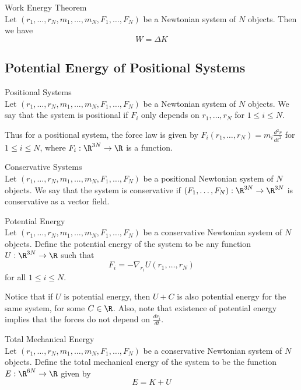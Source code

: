 \documentclass[a4paper]{article}
\begin{document}
\begin{thm}{Work Energy Theorem}{}\\
Let $(r_1,\dots,r_N,m_1,\dots,m_N,F_1,\dots,F_N)$ be a Newtonian system of $N$ objects. Then we have $$W=\Delta K$$
\end{thm}

\subsection{Potential Energy of Positional Systems}
\begin{defn}{Positional Systems}{}\\
Let $(r_1,\dots,r_N,m_1,\dots,m_N,F_1,\dots,F_N)$ be a Newtonian system of $N$ objects. We say that the system is positional if $F_i$ only depends on $r_1,\dots,r_N$ for $1\leq i\leq N$. 
\end{defn}

Thus for a positional system, the force law is given by $F_i(r_1,\dots,r_N)=m_i\frac{d^2r}{dt^2}$ for $1\leq i\leq N$, where $F_i:\R^{3N}\to\R$ is a function. 

\begin{defn}{Conservative Systems}{}\\
Let $(r_1,\dots,r_N,m_1,\dots,m_N,F_1,\dots,F_N)$ be a positional Newtonian system of $N$ objects. We say that the system is conservative if $(F_1,\dots,F_N):\R^{3N}\to\R^{3N}$ is conservative as a vector field. 
\end{defn}

\begin{defn}{Potential Energy}{}\\
Let $(r_1,\dots,r_N,m_1,\dots,m_N,F_1,\dots,F_N)$ be a conservative Newtonian system of $N$ objects. Define the potential energy of the system to be any function $U:\R^{3N}\to\R$ such that $$F_i=-\nabla_{r_i}U(r_1,\dots,r_N)$$ for all $1\leq i\leq N$. 
\end{defn}

Notice that if $U$ is potential energy, then $U+C$ is also potential energy for the same system, for some $C\in\R$. Also, note that existence of potential energy implies that the forces do not depend on $\frac{dr_i}{dt}$. 

\begin{defn}{Total Mechanical Energy}{}\\
Let $(r_1,\dots,r_N,m_1,\dots,m_N,F_1,\dots,F_N)$ be a conservative Newtonian system of $N$ objects. Define the total mechanical energy of the system to be the function $E:\R^{6N}\to\R$ given by $$E=K+U$$
\end{defn}
\end{document}
